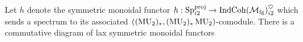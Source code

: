 \begin{lem} \label{lem:main-lem}
  Let $h$ denote the symmetric monoidal functor $h : \operatorname{\mathrm{Sp}}_{i2} ^{\mathrm{proj}} \to \mathrm{IndCoh}(\mathcal{M}_{\mathrm{fg}})_{i2} ^{\heartsuit}$
  which sends a spectrum to its associated $((\operatorname{\mathrm{MU}}_2)_*, (\operatorname{\mathrm{MU}}_2)_*\operatorname{\mathrm{MU}}_2 )$-comodule.  
  There is a commutative diagram of lax symmetric monoidal functors
  \begin{center}
  \end{center}

\end{lem}

